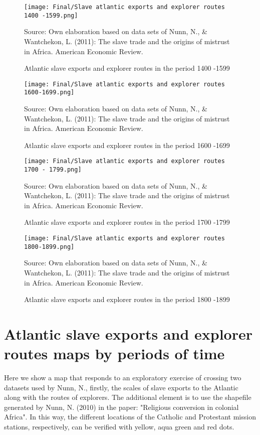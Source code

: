 \documentclass[a4paper,11pt]{article}
\begin{document}
\begin{figure}[H]
\caption{Atlantic slave exports and explorer routes in the period 1400 -1599}
\centering
\texttt{[image: Final/Slave atlantic exports and explorer routes 1400 -1599.png]}
\label{}
\centering

Source: Own elaboration based on data sets of Nunn, N., \& Wantchekon, L. (2011): The slave trade and the origins of mistrust in Africa. American Economic Review.
\end{figure}

\begin{figure}[H]
\caption{Atlantic slave exports and explorer routes in the period 1600 -1699}
\centering
\texttt{[image: Final/Slave atlantic exports and explorer routes 1600-1699.png]}
\label{}
\centering

Source: Own elaboration based on data sets of Nunn, N., \& Wantchekon, L. (2011): The slave trade and the origins of mistrust in Africa. American Economic Review.
\end{figure}


\begin{figure}[H]
\caption{Atlantic slave exports and explorer routes in the period 1700 -1799}
\centering
\texttt{[image: Final/Slave atlantic exports and explorer routes 1700 - 1799.png]}
\label{}
\centering

Source: Own elaboration based on data sets of Nunn, N., \& Wantchekon, L. (2011): The slave trade and the origins of mistrust in Africa. American Economic Review.
\end{figure}


\begin{figure}[H]
\caption{Atlantic slave exports and explorer routes in the period 1800 -1899}
\centering
\texttt{[image: Final/Slave atlantic exports and explorer routes 1800-1899.png]}
\label{}
\centering

Source: Own elaboration based on data sets of Nunn, N., \& Wantchekon, L. (2011): The slave trade and the origins of mistrust in Africa. American Economic Review.
\end{figure}



\section*{\textcolor{officegreen}{Atlantic slave exports and explorer routes maps by periods of time}}

Here we show a map that responds to an exploratory exercise of crossing two datasets used by Nunn, N., firstly, the scales of slave exports to the Atlantic along with the routes of explorers. The additional element is to use the shapefile generated by Nunn, N. (2010) in the paper: "Religious conversion in colonial Africa". In this way, the different locations of the Catholic and Protestant mission stations, respectively, can be verified with yellow, aqua green and red dots.
\end{document}
